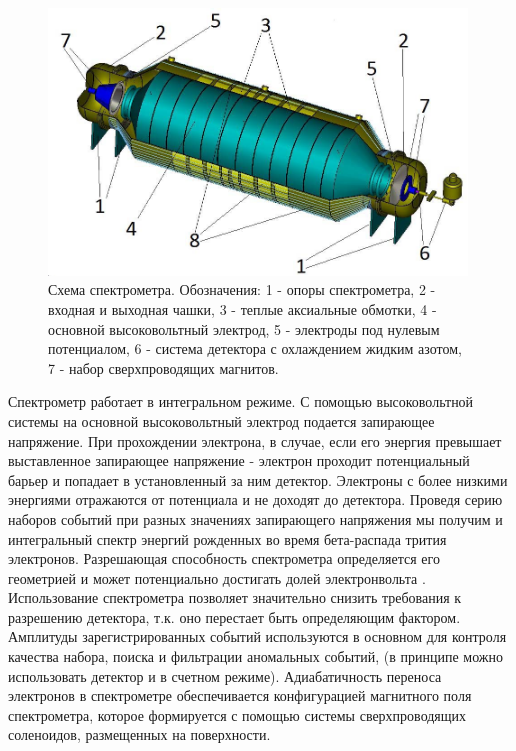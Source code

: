 \documentclass[a4paper,14pt]{extreport}
\begin{document}
\begin{figure}
  \centering
  \includegraphics[width = 0.99\textwidth]{img/nu_mass_setup/spectrometer.jpg}
    \caption{Схема спектрометра. Обозначения: 1 - опоры спектрометра, 2 - входная и выходная чашки, 3 - теплые аксиальные обмотки, 4 - основной высоковольтный электрод, 5 - электроды под нулевым потенциалом, 6 - система детектора с охлаждением жидким азотом, 7 - набор сверхпроводящих магнитов.}
    \label{fig:numass-spectrometer}
\end{figure}

Спектрометр работает в интегральном режиме. С помощью высоковольтной системы на основной высоковольтный электрод подается запирающее напряжение. При прохождении электрона, в случае, если его энергия превышает выставленное запирающее напряжение - электрон проходит потенциальный барьер и попадает в установленный за ним детектор. Электроны с более низкими энергиями отражаются от потенциала и не доходят до детектора. Проведя серию наборов событий при разных значениях запирающего напряжения мы получим и интегральный спектр энергий рожденных во время бета-распада трития электронов. Разрешающая способность спектрометра определяется его геометрией и может потенциально достигать долей электронвольта \cite{katrin-design-report-2004}. Использование спектрометра позволяет значительно снизить требования к разрешению детектора, т.к. оно перестает быть определяющим фактором. Амплитуды зарегистрированных событий используются в основном для контроля качества набора,  поиска и фильтрации аномальных событий, (в принципе можно использовать детектор и в счетном режиме). Адиабатичность переноса электронов в спектрометре обеспечивается конфигурацией магнитного поля спектрометра, которое формируется с помощью системы сверхпроводящих соленоидов, размещенных на поверхности.
\end{document}
